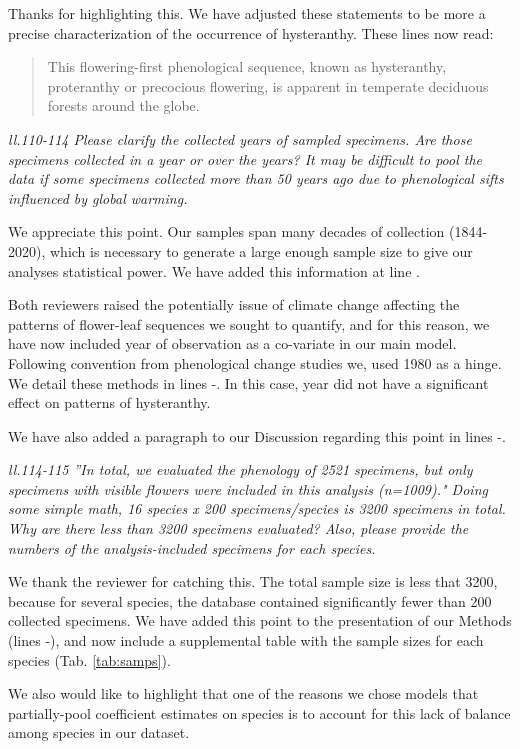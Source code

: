 \documentclass{article}[12pt]
\begin{document}
Thanks for highlighting this. We have adjusted these statements to be more a precise characterization of the occurrence of hysteranthy. These lines now read:
\begin{quote} This flowering-first phenological sequence, known as hysteranthy, proteranthy or precocious flowering, is apparent in temperate deciduous forests around the globe. \end{quote}

\emph{ll.110-114 Please clarify the collected years of sampled specimens. Are those specimens collected in a year or over the years? It may be difficult to pool the data if some specimens collected more than 50 years ago due to phenological sifts influenced by global warming.}

We appreciate this point. Our samples span many decades of collection (1844-2020), which is necessary to generate a large enough sample size to give our analyses statistical power. We have added this information at line .

Both reviewers raised the potentially issue of climate change affecting the patterns of flower-leaf sequences we sought to quantify, and for this reason, we have now included year of observation as a co-variate in our main model. Following convention from phenological change studies we, used 1980 as a hinge. We detail these methods in lines -. In this case, year did not have a significant effect on patterns of hysteranthy.

We have also added a paragraph to our Discussion regarding this point in lines -.

\emph{ll.114-115 ''In total, we evaluated the phenology of 2521 specimens, but only specimens with visible flowers were included in this analysis (n=1009)."
Doing some simple math, 16 species x 200 specimens/species is 3200 specimens in total. Why are there less than 3200 specimens evaluated? Also, please provide the numbers of the analysis-included specimens for each species.}

We thank the reviewer for catching this. The total sample size is less that 3200, because for several species, the database contained significantly fewer than 200 collected specimens. We have added this point to the presentation of our Methods (lines -), and now include a supplemental table with the sample sizes for each species (Tab. \ref{tab:samps}). 

We also would like to highlight that one of the reasons we chose models that partially-pool coefficient estimates on species is to account for this lack of balance among species in our dataset.
\end{document}
